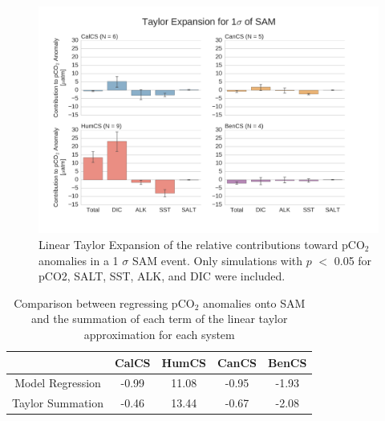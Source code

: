 \documentclass[12pt]{article}
\begin{document}
\clearpage
\begin{figure}[!h]
	\centering
	\includegraphics[width=\linewidth]{../../figs/all-systems/taylor_expansions/taylor-expansion-SAM-pCO2-PVALUEREMOVED-smoothedClimate.png}
	\caption{Linear Taylor Expansion of the relative contributions toward pCO$_{2}$ anomalies in a 1 $\sigma$ SAM event. Only simulations with $p$ $<$ 0.05 for pCO2, SALT, SST, ALK, and DIC were included.}
	\label{fig:taylor-sam}
\end{figure}
\begin{table}[!h]
	\centering
	\begin{tabular}{c | c c c c }
		& CalCS & HumCS & CanCS & BenCS \\
		\midrule
		Model Regression & -0.99 & 11.08 & -0.95 & -1.93 \\
		Taylor Summation & -0.46 & 13.44 & -0.67 & -2.08 \\
	\end{tabular}
	\caption{Comparison between regressing pCO$_{2}$ anomalies onto SAM and the summation of each term of the linear taylor approximation for each system}
	\label{tab:taylor-sam}
\end{table}

\clearpage

\end{document}
